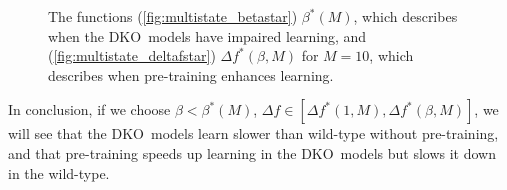 \documentclass[10pt]{article}
\renewenvironment{myenumA}{\begin{inparaenum}[\bfseries A]}{\end{inparaenum}}
\newcommand{\KO}{DKO}
\begin{document}
\begin{figure}
\begin{preview}
 \begin{center}
 \begin{myenumA}
  \item{}\label{fig:multistate_betastar}
  \item{}\label{fig:multistate_deltafstar}
 \end{myenumA}
 \end{center}
\end{preview}
  \caption[The functions $\beta^*(M)$ and $\Delta f^*(\beta,M)$]{The functions
  (\ref{fig:multistate_betastar}) $\beta^*(M)$, which describes when the \KO\ models have impaired learning,
  and (\ref{fig:multistate_deltafstar}) $\Delta f^*(\beta,M)$ for $M=10$, which describes when pre-training enhances learning.}\label{fig:multistate_star}
\end{figure}

In conclusion, if we choose $\beta<\beta^*(M)$, $\Delta f \in [\Delta f^*(1,M),\Delta f^*(\beta,M)]$, we will see that the \KO\ models learn slower than wild-type without pre-training, and that pre-training speeds up learning in the \KO\ models but slows it down in the wild-type.
\end{document}
